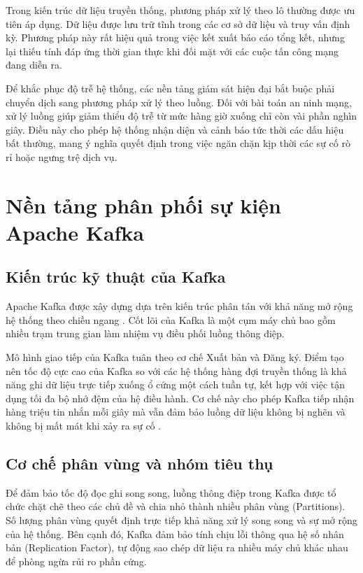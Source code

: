 \documentclass[12pt,a4paper]{report}
\begin{document}
Trong kiến trúc dữ liệu truyền thống, phương pháp xử lý theo lô thường được ưu tiên áp dụng. Dữ liệu được lưu trữ tĩnh trong các cơ sở dữ liệu và truy vấn định kỳ. Phương pháp này rất hiệu quả trong việc kết xuất báo cáo tổng kết, nhưng lại thiếu tính đáp ứng thời gian thực khi đối mặt với các cuộc tấn công mạng đang diễn ra.

Để khắc phục độ trễ hệ thống, các nền tảng giám sát hiện đại bắt buộc phải chuyển dịch sang phương pháp xử lý theo luồng. Đối với bài toán an ninh mạng, xử lý luồng giúp giảm thiểu độ trễ từ mức hàng giờ xuống chỉ còn vài phần nghìn giây. Điều này cho phép hệ thống nhận diện và cảnh báo tức thời các dấu hiệu bất thường, mang ý nghĩa quyết định trong việc ngăn chặn kịp thời các sự cố rò rỉ hoặc ngưng trệ dịch vụ.

\section{Nền tảng phân phối sự kiện Apache Kafka}
\subsection{Kiến trúc kỹ thuật của Kafka}
Apache Kafka được xây dựng dựa trên kiến trúc phân tán với khả năng mở rộng hệ thống theo chiều ngang \cite{kafka_doc}. Cốt lõi của Kafka là một cụm máy chủ bao gồm nhiều trạm trung gian làm nhiệm vụ điều phối luồng thông điệp.

Mô hình giao tiếp của Kafka tuân theo cơ chế Xuất bản và Đăng ký. Điểm tạo nên tốc độ cực cao của Kafka so với các hệ thống hàng đợi truyền thống là khả năng ghi dữ liệu trực tiếp xuống ổ cứng một cách tuần tự, kết hợp với việc tận dụng tối đa bộ nhớ đệm của hệ điều hành. Cơ chế này cho phép Kafka tiếp nhận hàng triệu tin nhắn mỗi giây mà vẫn đảm bảo luồng dữ liệu không bị nghẽn và không bị mất mát khi xảy ra sự cố \cite{confluent_bench}.

\subsection{Cơ chế phân vùng và nhóm tiêu thụ}
Để đảm bảo tốc độ đọc ghi song song, luồng thông điệp trong Kafka được tổ chức chặt chẽ theo các chủ đề và chia nhỏ thành nhiều phân vùng (Partitions). Số lượng phân vùng quyết định trực tiếp khả năng xử lý song song và sự mở rộng của hệ thống. Bên cạnh đó, Kafka đảm bảo tính chịu lỗi thông qua hệ số nhân bản (Replication Factor), tự động sao chép dữ liệu ra nhiều máy chủ khác nhau để phòng ngừa rủi ro phần cứng.
\end{document}

